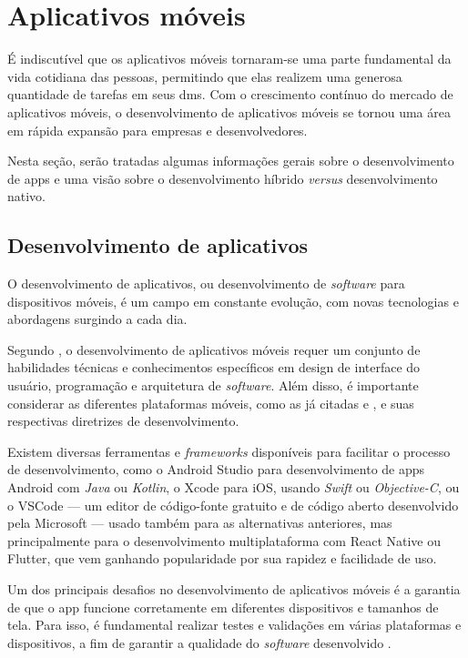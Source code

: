 \section{Aplicativos móveis}\label{sec:apps}
É indiscutível que os aplicativos móveis tornaram-se uma parte fundamental da vida cotidiana das pessoas, permitindo que elas realizem uma generosa quantidade de tarefas em seus \acp{dm}. Com o crescimento contínuo do mercado de aplicativos móveis, o desenvolvimento de aplicativos móveis se tornou uma área em rápida expansão para empresas e desenvolvedores.

Nesta seção, serão tratadas algumas informações gerais sobre o desenvolvimento de \acp{app} e uma visão sobre o desenvolvimento híbrido \textit{versus} desenvolvimento nativo.

\subsection{Desenvolvimento de aplicativos}\label{ssec:dev_apps}
O desenvolvimento de aplicativos, ou desenvolvimento de \textit{software} para dispositivos móveis, é um campo em constante evolução, com novas tecnologias e abordagens surgindo a cada dia.

Segundo \cite{Marconi2021}, o desenvolvimento de aplicativos móveis requer um conjunto de habilidades técnicas e conhecimentos específicos em design de interface do usuário, programação e arquitetura de \textit{software}. Além disso, é importante considerar as di\-fe\-ren\-tes plataformas móveis, como as já citadas  e , e suas respectivas diretrizes de desenvolvimento.

Existem diversas ferramentas e \textit{frameworks} disponíveis para facilitar o processo de desenvolvimento, como o Android Studio para desenvolvimento de \acp{app} Android com \textit{Java} ou \textit{Kotlin}, o Xcode para iOS, usando \textit{Swift} ou \textit{Objective-C}, ou o VSCode — um editor de código-fonte gratuito e de código aberto desenvolvido pela Microsoft — usado também para as alternativas anteriores, mas principalmente para o desenvolvimento multiplataforma com React Native ou Flutter, que vem ganhando popularidade por sua rapidez e facilidade de uso.

Um dos principais desafios no desenvolvimento de aplicativos móveis é a garantia de que o \ac{app} funcione corretamente em diferentes dispositivos e tamanhos de tela. Para isso, é fundamental realizar testes e validações em várias plataformas e dispositivos, a fim de garantir a qualidade do \textit{software} desenvolvido \cite{Biswal2020}.

